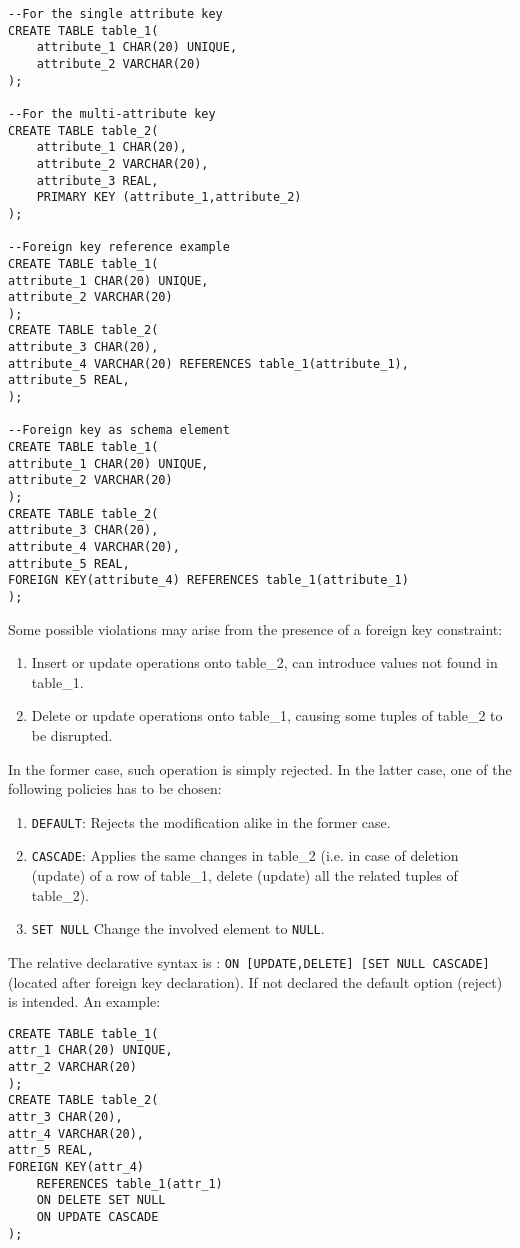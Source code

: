 \documentclass[a4page, 11pt]{article}
\theoremstyle{definition}
\begin{document}
\begin{lstlisting}
--For the single attribute key
CREATE TABLE table_1(
	attribute_1 CHAR(20) UNIQUE,
	attribute_2 VARCHAR(20)
);

--For the multi-attribute key
CREATE TABLE table_2(
	attribute_1 CHAR(20),
	attribute_2 VARCHAR(20),
	attribute_3 REAL,
	PRIMARY KEY (attribute_1,attribute_2)
);

--Foreign key reference example
CREATE TABLE table_1(
attribute_1 CHAR(20) UNIQUE,
attribute_2 VARCHAR(20)
);
CREATE TABLE table_2(
attribute_3 CHAR(20),
attribute_4 VARCHAR(20) REFERENCES table_1(attribute_1),
attribute_5 REAL,
);

--Foreign key as schema element
CREATE TABLE table_1(
attribute_1 CHAR(20) UNIQUE,
attribute_2 VARCHAR(20)
);
CREATE TABLE table_2(
attribute_3 CHAR(20),
attribute_4 VARCHAR(20),
attribute_5 REAL,
FOREIGN KEY(attribute_4) REFERENCES table_1(attribute_1)
);
\end{lstlisting}

Some possible violations may arise from the presence of a foreign key constraint:
\begin{enumerate}[noitemsep]
	\item Insert or update operations onto table\_2, can introduce values not found in table\_1.
	\item Delete or update operations onto table\_1, causing some tuples of table\_2 to be disrupted.
\end{enumerate}
In the former case, such operation is simply rejected. In the latter case, one of the following policies has to be chosen:
\begin{enumerate}[noitemsep]
	\item \texttt{DEFAULT}: Rejects the modification alike in the former case.
	\item \texttt{CASCADE}: Applies the same changes in table\_2 (i.e. in case of deletion (update) of a row of table\_1, delete (update) all the related tuples of table\_2).
	\item \texttt{SET NULL} Change the involved element to \texttt{NULL}.
\end{enumerate}
The relative declarative syntax is : \texttt{ON [UPDATE,DELETE] [SET NULL CASCADE]} (located after foreign key declaration). 
 If not declared the default option (reject) is intended.  An example:
\begin{lstlisting}
CREATE TABLE table_1(
attr_1 CHAR(20) UNIQUE,
attr_2 VARCHAR(20)
);
CREATE TABLE table_2(
attr_3 CHAR(20),
attr_4 VARCHAR(20),
attr_5 REAL,
FOREIGN KEY(attr_4)
	REFERENCES table_1(attr_1)
	ON DELETE SET NULL
	ON UPDATE CASCADE
);
\end{lstlisting}
\end{document}
